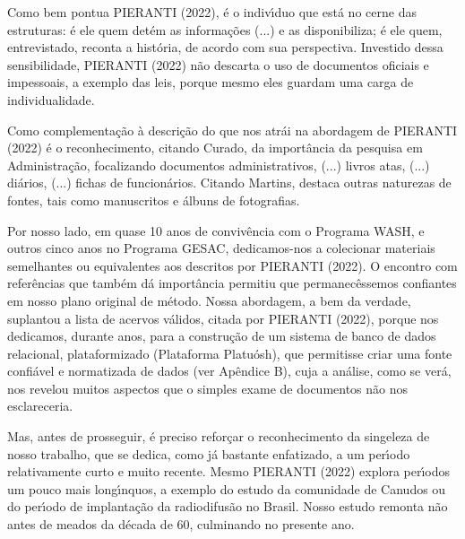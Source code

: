 \documentclass[
12pt,		%
openright,	%
twoside,  %
a4paper,			%
chapter=TITLE,		%
english,			%
french,				%
spanish,			%
brazil				%
]{USPSC-classe/USPSC}
\begin{document}
Como bem pontua  PIERANTI (2022), \textquotedbl \'e o indiv\'{\i}duo que est\'a no cerne das estruturas: \'e ele quem det\'em as informa\c{c}\~oes (...) e as disponibiliza; \'e ele quem, entrevistado, reconta a hist\'oria, de acordo com sua perspectiva\textquotedbl . Investido dessa sensibilidade,  PIERANTI (2022) n\~ao descarta o uso de documentos oficiais e impessoais, a exemplo das leis, porque mesmo eles \textquotedbl guardam uma carga de individualidade\textquotedbl .








Como complementa\c{c}\~ao \`a descri\c{c}\~ao do que nos atr\'ai na abordagem de  PIERANTI (2022) \'e o reconhecimento, citando Curado, da import\^ancia da pesquisa em Administra\c{c}\~ao, focalizando \textquotedbl documentos administrativos, (...) livros atas, (...) di\'arios, (...) fichas de funcion\'arios\textquotedbl . Citando Martins, destaca outras naturezas de fontes, tais como manuscritos e \'albuns de fotografias.








Por nosso lado, em quase 10 anos de conviv\^encia com o Programa WASH, e outros cinco anos no Programa GESAC, dedicamos-nos a colecionar materiais semelhantes ou equivalentes aos descritos por PIERANTI (2022). O encontro com refer\^encias que tamb\'em d\'a import\^ancia permitiu que permanec\^essemos confiantes em nosso plano original de m\'etodo. Nossa abordagem, a bem da verdade, suplantou a lista de acervos v\'alidos, citada por  PIERANTI (2022), porque nos dedicamos, durante anos, para a constru\c{c}\~ao de um sistema de banco de dados relacional, plataformizado (Plataforma Platu\'osh), que permitisse criar uma fonte confi\'avel e normatizada de dados (ver Ap\^endice B), cuja a an\'alise, como se ver\'a, nos revelou muitos aspectos que o simples exame de documentos n\~ao nos esclareceria.








Mas, antes de prosseguir, \'e preciso refor\c{c}ar o reconhecimento da singeleza de nosso trabalho, que se dedica, como j\'a bastante enfatizado, a um per\'{\i}odo relativamente curto e muito recente. Mesmo PIERANTI (2022) explora per\'{\i}odos um pouco mais long\'{\i}nquos, a exemplo do estudo da comunidade de Canudos ou do per\'{\i}odo de implanta\c{c}\~ao da radiodifus\~ao no Brasil. Nosso estudo remonta n\~ao antes de meados da d\'ecada de 60, culminando no presente ano.
\end{document}
